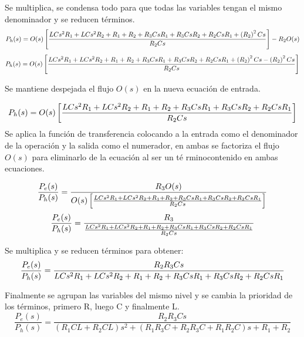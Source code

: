 \documentclass[letterpaper,11pt]{article}
\begin{document}
Se multiplica, se condensa todo para que todas las variables tengan el mismo
denominador y se reducen t\'{e}rminos. 
\begin{equation*}
P_{h}(s)=O(s)\left[ \frac{%
LCs^{2}R_{1}+LCs^{2}R_{2}+R_{1}+R_{2}+R_{3}CsR_{1}+R_{3}CsR_{2}+R_{2}CsR_{1}+\left( R_{2}\right) ^{2}Cs%
}{R_{2}Cs}\right] -R_{2}O(s)
\end{equation*}%
\begin{equation*}
P_{h}(s)=O(s)\left[ \frac{%
LCs^{2}R_{1}+LCs^{2}R_{2}+R_{1}+R_{2}+R_{3}CsR_{1}+R_{3}CsR_{2}+R_{2}CsR_{1}+\left( R_{2}\right) ^{2}Cs-\left( R_{2}\right) ^{2}Cs%
}{R_{2}Cs}\right] 
\end{equation*}

Se mantiene despejada el flujo $O(s)$ en la nueva ecuaci\'{o}n de entrada.

\begin{equation*}
P_{h}(s)=O(s)\left[ \frac{%
LCs^{2}R_{1}+LCs^{2}R_{2}+R_{1}+R_{2}+R_{3}CsR_{1}+R_{3}CsR_{2}+R_{2}CsR_{1}%
}{R_{2}Cs}\right] 
\end{equation*}%
Se aplica la funci\'{o}n de transferencia colocando a la entrada como el
denominador de la operaci\'{o}n y la salida como el numerador, en ambas se
factoriza el flujo $O(s)$ para eliminarlo de la ecuaci\'{o}n al ser un t\'{e}%
rminocontenido en ambas ecuaciones.

\begin{equation*}
\frac{P_{e}(s)}{P_{h}(s)}=\frac{R_{3}O(s)}{O(s)\left[ \frac{%
LCs^{2}R_{1}+LCs^{2}R_{2}+R_{1}+R_{2}+R_{3}CsR_{1}+R_{3}CsR_{2}+R_{2}CsR_{1}%
}{R_{2}Cs}\right] }
\end{equation*}%
\begin{equation*}
\frac{P_{e}(s)}{P_{h}(s)}=\frac{R_{3}}{\frac{%
LCs^{2}R_{1}+LCs^{2}R_{2}+R_{1}+R_{2}+R_{3}CsR_{1}+R_{3}CsR_{2}+R_{2}CsR_{1}%
}{R_{2}Cs}}
\end{equation*}

Se multiplica y se reducen t\'{e}rminos para obtener:%
\begin{equation*}
\frac{P_{e}(s)}{P_{h}(s)}=\frac{R_{2}R_{3}Cs}{%
LCs^{2}R_{1}+LCs^{2}R_{2}+R_{1}+R_{2}+R_{3}CsR_{1}+R_{3}CsR_{2}+R_{2}CsR_{1}}
\end{equation*}

Finalmente se agrupan las variables del mismo nivel y se cambia la prioridad
de los t\'{e}rminos, primero R, luego C y finalmente L.%
\begin{equation*}
\frac{P_{e}(s)}{P_{h}(s)}=\frac{R_{2}R_{3}Cs}{\left( R_{1}CL+R_{2}CL\right)
s^{2}+\left( R_{1}R_{3}C+R_{2}R_{3}C+R_{1}R_{2}C\right) s+R_{1}+R_{2}}
\end{equation*}
\end{document}

